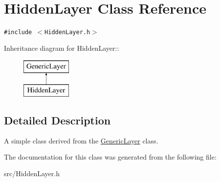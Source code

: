 \hypertarget{classHiddenLayer}{
\section{Hidden\-Layer Class Reference}
\label{classHiddenLayer}
}
{\tt \#include $<$Hidden\-Layer.h$>$}

Inheritance diagram for Hidden\-Layer::\begin{figure}[H]
\begin{center}
\leavevmode
\includegraphics[height=2cm]{classHiddenLayer}
\end{center}
\end{figure}


\subsection{Detailed Description}
A simple class derived from the \hyperlink{classGenericLayer}{Generic\-Layer} class. 



The documentation for this class was generated from the following file:\begin{CompactItemize}
\item 
src/Hidden\-Layer.h\end{CompactItemize}
